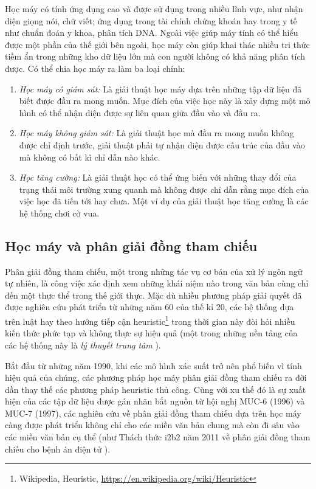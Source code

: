 Học máy có tính ứng dụng cao và được sử dụng trong nhiều lĩnh vực, như nhận diện giọng nói, chữ viết; ứng dụng trong tài chính chứng khoán hay trong y tế như chuẩn đoán y khoa, phân tích DNA. Ngoài việc giúp máy tính có thể hiểu được một phần của thế giới bên ngoài, học máy còn giúp khai thác nhiều tri thức tiềm ẩn trong những kho dữ liệu lớn mà con người không có khả năng phân tích được. Có thể chia học máy ra làm ba loại chính:
\begin{enumerate}
\item \emph{Học máy có giám sát:} Là giải thuật học máy dựa trên những tập dữ liệu đã biết được đầu ra mong muốn. Mục đích của việc học này là xây dựng một mô hình có thể nhận diện được sự liên quan giữa đầu vào và đầu ra. 
\item \emph{Học máy không giám sát:} Là giải thuật học mà đầu ra mong muốn không được chỉ định trước, giải thuật phải tự nhận diện được cấu trúc của đầu vào mà không có bất kì chỉ dẫn nào khác.
\item \emph{Học tăng cường:} Là giải thuật học có thể ứng biến với những thay đổi của trạng thái môi trường xung quanh mà không được chỉ dẫn rằng mục đích của việc học đã tiến tới hay chưa. Một ví dụ của giải thuật học tăng cường là các hệ thống chơi cờ vua.
\end{enumerate}

\subsection*{Học máy và phân giải đồng tham chiếu}
Phân giải đồng tham chiếu, một trong những tác vụ cơ bản của xử lý ngôn ngữ tự nhiên, là công việc xác định xem những khái niệm nào trong văn bản cùng chỉ đến một thực thể trong thế giới thực. Mặc dù nhiều phương pháp giải quyết đã được nghiên cứu phát triển từ những năm 60 của thế kỉ 20, các hệ thống dựa trên luật hay theo hướng tiếp cận heuristic\footnote{Wikipedia, Heuristic, \url{https://en.wikipedia.org/wiki/Heuristic}} trong thời gian này đòi hỏi nhiều kiến thức phức tạp và không thực sự hiệu quả (một trong những nền tảng của các hệ thống này là \emph{lý thuyết trung tâm} \cite{Grosz1983}).

Bắt đầu từ những năm 1990, khi các mô hình xác suất trở nên phổ biến vì tính hiệu quả của chúng, các phương pháp học máy phân giải đồng tham chiếu ra đời dần thay thế các phương pháp heuristic thủ công. Cùng với xu thế đó là sự xuất hiện của các tập dữ liệu được gán nhãn bắt nguồn từ hội nghị MUC-6 (1996) và MUC-7 (1997), các nghiên cứu về phân giải đồng tham chiếu dựa trên học máy càng được phát triển không chỉ cho các miền văn bản chung mà còn đi sâu vào các miền văn bản cụ thể (như Thách thức i2b2 năm 2011 về phân giải đồng tham chiếu cho bệnh án điện tử \cite{OzlemUzuner2012}).

